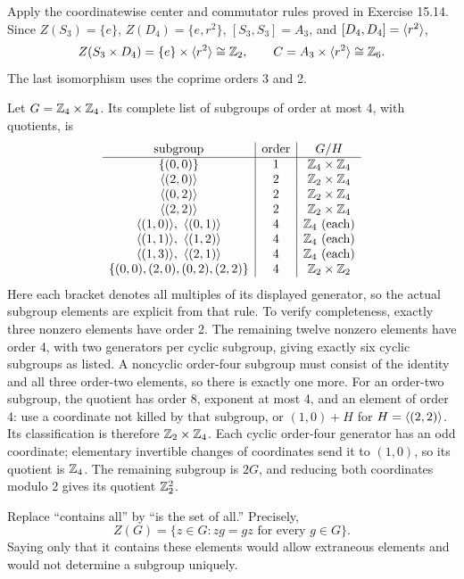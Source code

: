 Apply the coordinatewise center and commutator rules proved in Exercise 15.14. Since $Z(S_3)=\{e\}$, $Z(D_4)=\{e,r^2\}$, $[S_3,S_3]=A_3$, and $[D_4,D_4]=\langle r^2\rangle$,
\[Z(S_3\times D_4)=\{e\}\times\langle r^2\rangle\cong\mathbb{Z}_2,\qquad C=A_3\times\langle r^2\rangle\cong\mathbb{Z}_6.\]
The last isomorphism uses the coprime orders 3 and 2.

Let $G=\mathbb{Z}_4\times\mathbb{Z}_4$. Its complete list of subgroups of order at most 4, with quotients, is
\[
\begin{array}{c|c|c}
\text{subgroup}&\text{order}&G/H\\\hline
\{(0,0)\}&1&\mathbb{Z}_4\times\mathbb{Z}_4\\
\langle (2,0)\rangle&2&\mathbb{Z}_2\times\mathbb{Z}_4\\
\langle (0,2)\rangle&2&\mathbb{Z}_2\times\mathbb{Z}_4\\
\langle (2,2)\rangle&2&\mathbb{Z}_2\times\mathbb{Z}_4\\
\langle (1,0)\rangle,\ \langle (0,1)\rangle&4&\mathbb{Z}_4\text{ (each)}\\
\langle (1,1)\rangle,\ \langle (1,2)\rangle&4&\mathbb{Z}_4\text{ (each)}\\
\langle (1,3)\rangle,\ \langle (2,1)\rangle&4&\mathbb{Z}_4\text{ (each)}\\
\{(0,0),(2,0),(0,2),(2,2)\}&4&\mathbb{Z}_2\times\mathbb{Z}_2
\end{array}
\]
Here each bracket denotes all multiples of its displayed generator, so the actual subgroup elements are explicit from that rule. To verify completeness, exactly three nonzero elements have order 2. The remaining twelve nonzero elements have order 4, with two generators per cyclic subgroup, giving exactly six cyclic subgroups as listed. A noncyclic order-four subgroup must consist of the identity and all three order-two elements, so there is exactly one more.
For an order-two subgroup, the quotient has order 8, exponent at most 4, and an element of order 4: use a coordinate not killed by that subgroup, or $(1,0)+H$ for $H=\langle (2,2)\rangle$. Its classification is therefore $\mathbb{Z}_2\times\mathbb{Z}_4$. Each cyclic order-four generator has an odd coordinate; elementary invertible changes of coordinates send it to $(1,0)$, so its quotient is $\mathbb{Z}_4$. The remaining subgroup is $2G$, and reducing both coordinates modulo 2 gives its quotient $\mathbb{Z}_2^2$.

Replace ``contains all'' by ``is the set of all.'' Precisely,
\[Z(G)=\{z\in G:zg=gz\text{ for every }g\in G\}.\]
Saying only that it contains these elements would allow extraneous elements and would not determine a subgroup uniquely.

